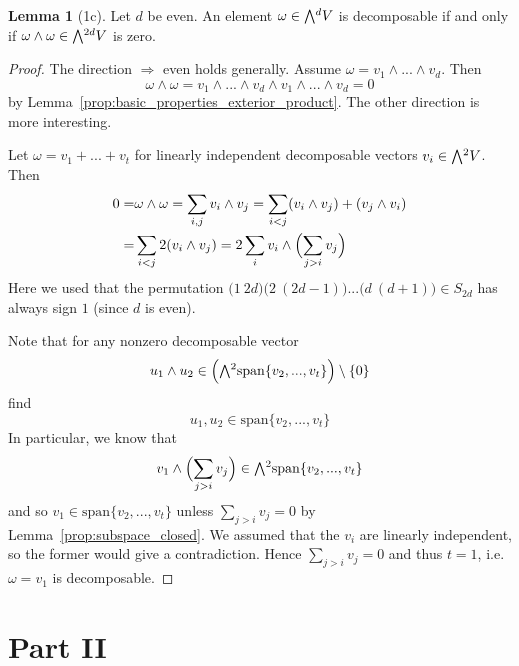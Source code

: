 \documentclass{scrartcl}
\newcommand{\extpow}{\mathchoice{{\textstyle\bigwedge}}
    {{\bigwedge}}
    {{\textstyle\wedge}}
    {{\scriptstyle\wedge}}}
\newcommand{\vspan}{\mathrm{span}}
\theoremstyle{definition}
\newtheorem{lemma}[definition]{Lemma}
\begin{document}
\begin{lemma}[1c]
    \label{prop:characterization_decomposable_d_even}
    Let $d$ be even.
    An element $\omega \in \extpow^d V$ is decomposable if and only if $\omega \wedge \omega \in \extpow^{2d} V$ is zero.
\end{lemma}
\begin{proof}
    The direction $\Rightarrow$ even holds generally. Assume $\omega = v_1 \wedge ... \wedge v_d$.
    Then
    \begin{equation*}
        \omega \wedge \omega = v_1 \wedge ... \wedge v_d \wedge v_1 \wedge ... \wedge v_d = 0
    \end{equation*}
    by Lemma~\ref{prop:basic_properties_exterior_product}. 
    The other direction is more interesting.

    Let $\omega = v_1 + ... + v_t$ for linearly independent decomposable vectors $v_i \in \extpow^2 V$.
    Then
    \begin{align*}
        0 =& \omega \wedge \omega = \sum_{i, j} v_i \wedge v_j = \sum_{i < j} (v_i \wedge v_j) + (v_j \wedge v_i) \\
        =& \sum_{i < j} 2(v_i \wedge v_j) = 2\sum_i v_i \wedge \Bigl( \sum_{j > i} v_j \Bigr)
    \end{align*}
    Here we used that the permutation $\bigl(1 \ 2d\bigr)\bigl(2 \ (2d - 1)\bigr)...\bigl(d \ (d + 1)\bigr) \in S_{2d}$ has always sign $1$ (since $d$ is even).

    Note that for any nonzero decomposable vector
    \begin{equation*}
        u_1 \wedge u_2 \in \Bigl( \extpow^2 \vspan\{v_2, ..., v_t\} \Bigr) \setminus \{0\}
    \end{equation*}
    find
    \begin{equation*}
        u_1, u_2 \in \vspan\{v_2, ..., v_t\}
    \end{equation*}
    In particular, we know that
    \begin{equation*}
        v_1 \wedge \Bigl( \sum_{j > i} v_j \Bigr) \in \extpow^2 \vspan\{v_2, ..., v_t\}
    \end{equation*}
    and so $v_1 \in \vspan\{v_2, ..., v_t\}$ unless $\sum_{j > i} v_j = 0$ by Lemma~\ref{prop:subspace_closed}.
    We assumed that the $v_i$ are linearly independent, so the former would give a contradiction.
    Hence $\sum_{j > i} v_j = 0$ and thus $t = 1$, i.e. $\omega = v_1$ is decomposable.
\end{proof}

\section{Part II}
\end{document}
